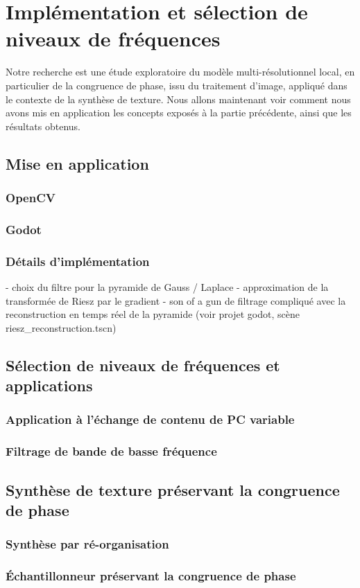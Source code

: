 \chapter{Implémentation et sélection de niveaux de fréquences}
\label{chap:chapitre2}

Notre recherche est une étude exploratoire du modèle multi-résolutionnel local, en particulier de la congruence de phase, issu du traitement d'image, appliqué dans le contexte de la synthèse de texture. Nous allons maintenant voir comment nous avons mis en application les concepts exposés à la partie précédente, ainsi que les résultats obtenus.

\section{Mise en application}

\subsection{OpenCV}

\subsection{Godot}

\subsection{Détails d'implémentation}
- choix du filtre pour la pyramide de Gauss / Laplace
- approximation de la transformée de Riesz par le gradient
- son of a gun de filtrage compliqué avec la reconstruction en temps réel de la pyramide (voir projet godot, scène riesz\_reconstruction.tscn)

\section{Sélection de niveaux de fréquences et applications}

\subsection{Application à l'échange de contenu de PC variable}

\subsection{Filtrage de bande de basse fréquence}

\section{Synthèse de texture préservant la congruence de phase}

\subsection{Synthèse par ré-organisation}

\subsection{Échantillonneur préservant la congruence de phase}
